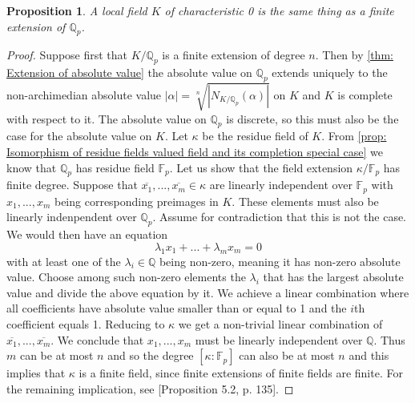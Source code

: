 \documentclass{article}
\newtheorem{proposition}{Proposition}[section]
\newcommand{\mfrak}[1]{\mathfrak{#1}}
\newcommand{\mbb}[1]{\mathbb{#1}}
\numberwithin{equation}{section}
\begin{document}
\begin{proposition}\label{prop: Characterization of local fields}
    A local field $K$ of characteristic 0 is the same thing as a finite extension of $\mbb Q_p$.
\end{proposition}
\begin{proof}
    Suppose first that $K /\mbb Q_p$ is a finite extension of degree $n$. Then by \cref{thm: Extension of absolute value} the absolute value on $\mbb Q_p$ extends uniquely to the non-archimedian absolute value $|\alpha| = \sqrt[n]{|N_{K/\mbb Q_p}(\alpha)|}$ on $K$ and $K$ is complete with respect to it. The absolute value on $\mbb Q_p$ is discrete, so this must also be the case for the absolute value on $K$. Let $\kappa$ be the residue field of $K$. From \cref{prop: Isomorphism of residue fields valued field and its completion special case} we know that $\mbb Q_p$ has residue field $\mbb F_p$. Let us show that the field extension $\kappa / \mbb F_p$ has finite degree. Suppose that $\overline {x_1}, ..., \overline{x_m} \in \kappa$ are linearly independent over $\mbb F_p$ with $x_1, ..., x_m$ being corresponding preimages in $K$. These elements must also be linearly indenpendent over $\mbb Q_p$. Assume for contradiction that this is not the case. We would then have an equation
    $$\lambda_1 x_1 + ... + \lambda_m x_m = 0$$
    with at least one of the $\lambda_i \in \mbb Q$ being non-zero, meaning it has non-zero absolute value. Choose among such non-zero elements the $\lambda_i$ that has the largest absolute value and divide the above equation by it. We achieve a linear combination where all coefficients have absolute value smaller than or equal to 1 and the $i$th coefficient equals 1. Reducing to $\kappa$ we get a non-trivial linear combination of $\overline{x_1}, ..., \overline{x_m}$. We conclude that $x_1, ..., x_m$ must be linearly independent over $\mbb Q$. Thus $m$ can be at most $n$ and so the degree $[\kappa : \mbb F_p]$ can also be at most $n$ and this implies that $\kappa$ is a finite field, since finite extensions of finite fields are finite. For the remaining implication, see \citep{neukirch}[Proposition 5.2, p. 135]. 



\end{proof}
\end{document}
